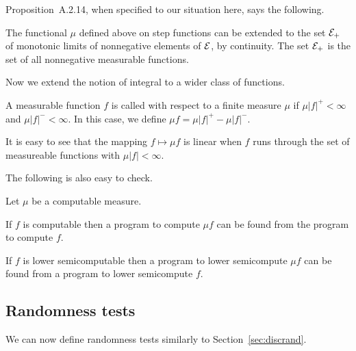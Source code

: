 Proposition~A.2.14, when specified to our situation here, says
the following.

 \begin{proposition}\label{propo:Riesz-extension-seqs}
  \notready
The functional \( \mu \) defined above on step functions
can be extended to the set
\( \mathcal{E}_{+} \) of monotonic limits of nonnegative elements of \( \mathcal{E} \), by
continuity.
The set \( \mathcal{E}_{+} \) is the set of all nonnegative measurable functions.
 \end{proposition}

Now we extend the notion of integral to a wider class of functions.

 \begin{definition}
  \label{def:g2.3.27}
  \notready
A measurable function \( f \) is called  with respect to a finite
measure \( \mu \) if \( \mu |f|^{+} < \infty \) and \( \mu |f|^{-} < \infty \).
In this case, we define \( \mu f = \mu |f|^{+} - \mu |f|^{-} \).
 \end{definition}

It is easy to see that the
mapping \( f\mapsto \mu f \) is linear when \( f \) runs through the set of
measureable functions with \( \mu |f|<\infty \).

The following is also easy to check.

\begin{proposition}
  \label{prop:g2.3.28}
  \notready
Let \( \mu \) be a computable measure.
\begin{alphenum}
   \item
If \( f \) is computable then a program to compute
\( \mu f \) can be found from the program to compute \( f \).
   \item
If \( f \) is lower semicomputable then a program to lower semicompute
\( \mu f \) can be found from a program to lower semicompute \( f \).
\end{alphenum}
\end{proposition}

\subsection{Randomness tests}

We can now define randomness tests similarly to Section~\ref{sec:discrand}.

